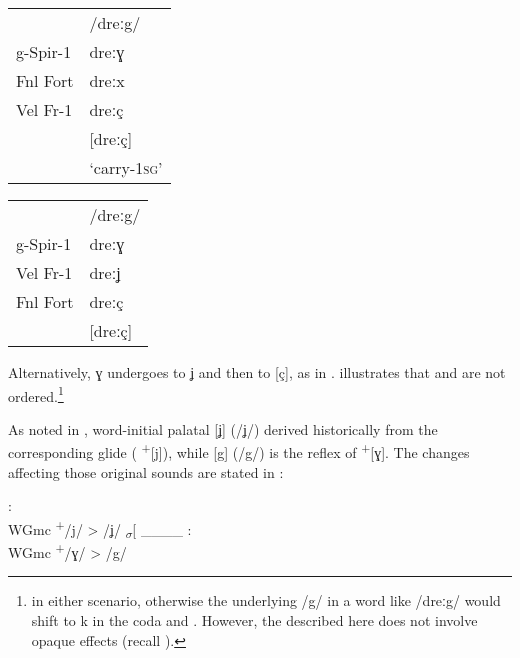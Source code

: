  \ea \label{ex:4:9}
 \begin{multicols}{2}\raggedcolumns 
 \ea  \label{ex:4:9a}  
      \begin{tabular}[t]{@{}ll@{}}
                      & /dreːg/\\ 
             g-Spir-1 & dreːɣ  \\                
             Fnl Fort & dreːx  \\                
             Vel Fr-1 & dreːç  \\                
                      & [dreːç]\\                  
                      & ‘carry-\textsc{1sg}’
     \end{tabular}
\columnbreak    
\ex   \label{ex:4:9b}
      \begin{tabular}[t]{@{}ll@{}}
               & /dreːg/\\
      g-Spir-1 &  dreːɣ \\
      Vel Fr-1 &  dreːʝ \\
      Fnl Fort &  dreːç \\
               & [dreːç]
       \end{tabular}
\z
\end{multicols}
\z

Alternatively, {\textbar}ɣ{\textbar} undergoes  to {\textbar}ʝ{\textbar} and then  to [ç], as in .  illustrates that  and  are not ordered.\footnote{{   in either scenario, otherwise the underlying /g/ in a word like /dreːg/ would shift to {\textbar}k{\textbar} in the coda and  . However, the  described here does not involve opaque  effects (recall ).} }

As noted in , word-initial palatal [ʝ] (/ʝ/) derived historically from the corresponding glide ( \textsuperscript{+}[j]), while [g] (/g/) is the reflex of  \textsuperscript{+}[ɣ]. The changes affecting those original sounds are stated in :

\ea%
    \label{ex:4:10}
    \begin{multicols}{2}\raggedcolumns
\ea {}:\label{ex:4:10a}\\
    WGmc \textsuperscript{+}/j/ > /ʝ/ \textsubscript{${\sigma}$}[ \_\_\_\_
\columnbreak
\ex {}:\label{ex:4:10b}\\
    WGmc \textsuperscript{+}/ɣ/ > /g/
\z 
\end{multicols}
\z 

